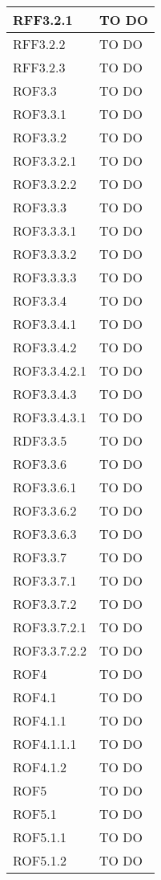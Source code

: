 \begin{center}
\begin{longtable}{| p{4cm} | p{8cm} |}
\hline
RFF3.2.1   &  TO DO \\
\hline
RFF3.2.2   &  TO DO \\
\hline
RFF3.2.3   &  TO DO \\
\hline
ROF3.3   &  TO DO \\
\hline
ROF3.3.1   &  TO DO \\
\hline
ROF3.3.2   &  TO DO \\
\hline
ROF3.3.2.1   &  TO DO \\
\hline
ROF3.3.2.2   &  TO DO \\
\hline
ROF3.3.3   &  TO DO \\
\hline
ROF3.3.3.1   &  TO DO \\
\hline
ROF3.3.3.2   &  TO DO \\
\hline
ROF3.3.3.3   &  TO DO \\
\hline
ROF3.3.4   &  TO DO \\
\hline
ROF3.3.4.1   &  TO DO \\
\hline
ROF3.3.4.2   &  TO DO \\
\hline
ROF3.3.4.2.1   &  TO DO \\
\hline
ROF3.3.4.3   &  TO DO \\
\hline
ROF3.3.4.3.1   &  TO DO \\
\hline
RDF3.3.5   &  TO DO \\
\hline
ROF3.3.6   &  TO DO \\
\hline
ROF3.3.6.1   &  TO DO \\
\hline
ROF3.3.6.2   &  TO DO \\
\hline
ROF3.3.6.3   &  TO DO \\
\hline
ROF3.3.7   &  TO DO \\
\hline
ROF3.3.7.1   &  TO DO \\
\hline
ROF3.3.7.2   &  TO DO \\
\hline
ROF3.3.7.2.1   &  TO DO \\
\hline
ROF3.3.7.2.2   &  TO DO \\
\hline
ROF4   &  TO DO \\
\hline
ROF4.1   &  TO DO \\
\hline
ROF4.1.1   &  TO DO \\
\hline
ROF4.1.1.1   &  TO DO \\
\hline
ROF4.1.2   &  TO DO \\
\hline
ROF5   &  TO DO \\
\hline
ROF5.1   &  TO DO \\
\hline
ROF5.1.1   &  TO DO \\
\hline
ROF5.1.2   &  TO DO \\

\end{longtable}
\end{center}
